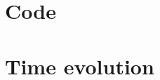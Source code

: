 \documentclass[11pt, a4paper, oneside]{article}
\begin{document}
\begin{appendices}


\section{Code} \label{appendix:code}






\section{Time evolution} \label{appendix:evolution}

\end{appendices}
\end{document}
